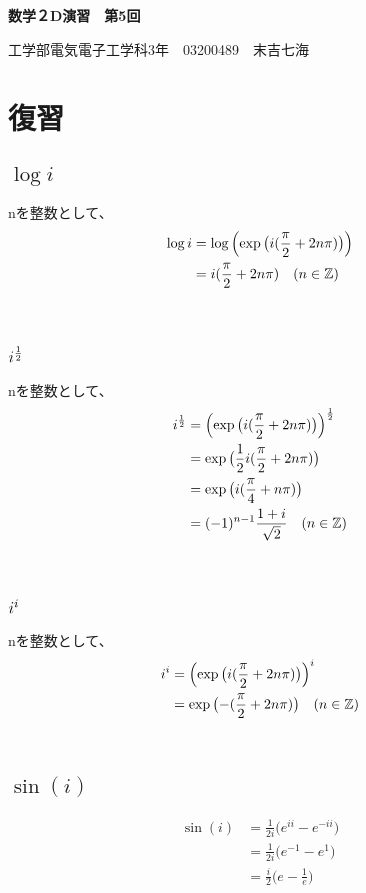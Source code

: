 \documentclass[dvipdfmx,a4paper]{jsarticle}
\begin{document}
\begin{center}
\textbf{\huge{数学２D演習　第5回}}
\end{center}

\begin{flushright}
工学部電気電子工学科3年　03200489　末吉七海\\
\end{flushright}

\section{復習}

\subsection{$\log{i}$}
nを整数として、
\begin{align*}
\log{i} &= \log{\Bigl(\exp{\bigl(i(\frac{\pi}{2} + 2n\pi )\bigr)}\Bigr)}\\
&= i(\frac{\pi}{2} + 2n\pi) \quad (n \in \mathbb{Z})
\end{align*}
\\
\subsection{$\mbox{\large$i^\frac{1}{2}$}$}
nを整数として、
\begin{align*}
i^\frac{1}{2} &= \Bigl(\exp{\bigl(i(\frac{\pi}{2} + 2n\pi )\bigr)}\Bigr)^{\frac{1}{2}}\\
&= \exp{\bigl(\frac{1}{2}i(\frac{\pi}{2} + 2n\pi )\bigr)}\\
&= \exp{\bigl(i(\frac{\pi}{4} + n\pi )\bigr)}\\
&= (-1)^{n-1}\frac{1 + i}{\sqrt{2}} \quad (n \in \mathbb{Z})
\end{align*}
\\
\subsection{$\mbox{\large$i^i$}$}
nを整数として、
\begin{align*}
i^i &= \Bigl(\exp{\bigl(i(\frac{\pi}{2} + 2n\pi )\bigr)}\Bigr)^i\\
&= \exp{\bigl(-(\frac{\pi}{2} + 2n\pi )\bigr)} \quad (n \in \mathbb{Z})
\end{align*}
\\
\subsection{$\sin{(i)}$}
\begin{align*}
\sin{(i)} &= \frac{1}{2i}\bigl(e^{ii} - e^{-ii}\bigr)\\
&= \frac{1}{2i}\bigl(e^{-1} - e^{1}\bigr)\\
&= \frac{i}{2}\bigl(e - \frac{1}{e}\bigr)
\end{align*}
\\
\end{document}

